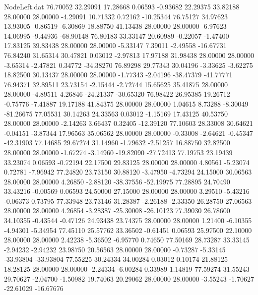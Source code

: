 \begin{filecontents}{NodeLeft.dat}
  76.70052   32.29091   17.28668     0.06593   -0.93682   22.29375   33.82188   28.00000   28.00000   -4.29091   10.71332    0.72162  -10.25344
  76.75127   34.97623   13.93005    -0.86519   -6.30869   18.88750   41.13438   28.00000   28.00000   -6.97623   14.06995   -9.44936  -68.90148
  76.80183   33.33147   20.60989    -0.22057   -1.47400   17.83125   39.83438   28.00000   28.00000   -5.33147    7.39011   -2.49558  -16.67731
  76.84240   31.65314   30.47821     0.03012   -2.97813   17.97188   31.98438   28.00000   28.00000   -3.65314   -2.47821    0.34772  -34.38270
  76.89298   29.77343   30.04196    -3.33625   -3.62275   18.82500   30.13437   28.00000   28.00000   -1.77343   -2.04196  -38.47379  -41.77771
  76.94371   32.89511   23.73154    -2.15444   -2.72744   15.65625   35.41875   28.00000   28.00000   -4.89511    4.26846  -24.21337  -30.65320
  76.98422   26.95385   19.26712    -0.75776   -7.41887   19.17188   41.84375   28.00000   28.00000    1.04615    8.73288   -8.30049  -81.26675
  77.05531   30.14263   24.33563     0.03012   -1.15169   17.43125   40.53750   28.00000   28.00000   -2.14263    3.66437    0.32405  -12.39120
  77.10603   28.33008   30.64621    -0.04151   -3.87344   17.96563   35.06562   28.00000   28.00000   -0.33008   -2.64621   -0.45347  -42.31903
  77.14685   29.67274   31.14960    -1.79632   -2.51257   16.88750   32.82500   28.00000   28.00000   -1.67274   -3.14960  -19.82090  -27.72413
  77.19753   23.19439   33.23074     0.06593   -0.72194   22.17500   29.83125   28.00000   28.00000    4.80561   -5.23074    0.72781   -7.96942
  77.24820   23.73150   30.88120    -3.47950   -4.73294   24.15000   30.06563   28.00000   28.00000    4.26850   -2.88120  -38.37556  -52.19975
  77.28895   24.70490   33.43216    -0.00569    0.06593   24.50000   27.15000   28.00000   28.00000    3.29510   -5.43216   -0.06373    0.73795
  77.33948   23.73146   31.28387    -2.26188   -2.33350   26.28750   27.06563   28.00000   28.00000    4.26854   -3.28387  -25.30008  -26.10123
  77.39030   26.78600   34.10355    -0.43544   -0.47126   24.93438   23.74375   28.00000   28.00000    1.21400   -6.10355   -4.94301   -5.34954
  77.45110   25.57762   33.36502    -0.61451    0.06593   25.97500   22.10000   28.00000   28.00000    2.42238   -5.36502   -6.95770    0.74650
  77.50169   28.73287   33.33145    -2.94232   -2.94232   23.98750   20.56563   28.00000   28.00000   -0.73287   -5.33145  -33.93804  -33.93804
  77.55225   30.24334   34.00284     0.03012    0.10174   21.88125   18.28125   28.00000   28.00000   -2.24334   -6.00284    0.33989    1.14819
  77.59274   31.55243   29.70627    -2.04700   -1.50982   19.74063   20.29062   28.00000   28.00000   -3.55243   -1.70627  -22.61029  -16.67676

\end{filecontents}
